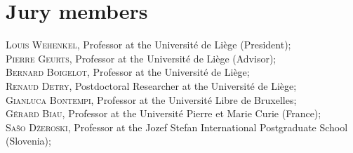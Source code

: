 
\chapter*{Jury members}


\noindent \textsc{Louis Wehenkel}, Professor at the Universit{\'e} de Li{\`e}ge (President); \\

\noindent \textsc{Pierre Geurts}, Professor at the Universit{\'e} de Li{\`e}ge (Advisor); \\

\noindent \textsc{Bernard Boigelot}, Professor at the Universit{\'e} de Li{\`e}ge; \\

\noindent \textsc{Renaud Detry}, Postdoctoral Researcher at the Universit{\'e} de Li{\`e}ge; \\

\noindent \textsc{Gianluca Bontempi}, Professor at the Universit{\'e} Libre de Bruxelles; \\

\noindent \textsc{G{\'e}rard Biau}, Professor at the Universit{\'e} Pierre et Marie Curie (France); \\

\noindent \textsc{Sa\v{s}o D\v{z}eroski}, Professor at the Jozef Stefan International Postgraduate School (Slovenia); \\
